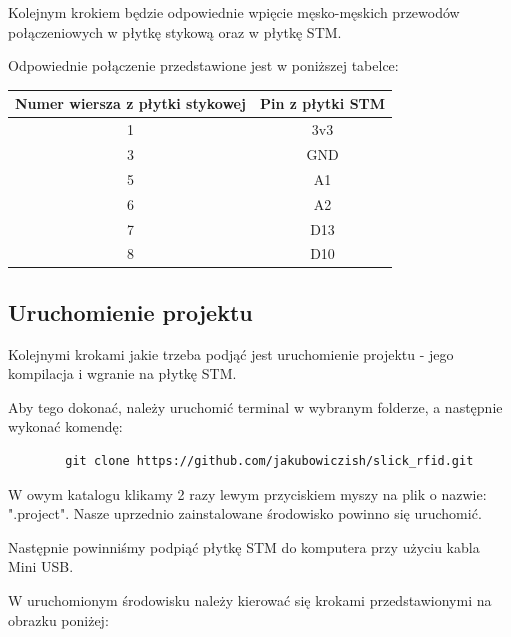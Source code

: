 \documentclass[12pt,hidelinks]{article}
\begin{document}
    \newpage

    Kolejnym krokiem będzie odpowiednie wpięcie męsko-męskich przewodów połączeniowych w płytkę stykową oraz w płytkę STM.

    Odpowiednie połączenie przedstawione jest w poniższej tabelce:

    \begin{center}
        \begin{tabular}{ |c|c| }
            \hline
            Numer wiersza z płytki stykowej & Pin z płytki STM \\
            \hline
            1 & 3v3 \\
            \hline
            3 & GND \\
            \hline
            5 & A1 \\
            \hline
            6 & A2 \\
            \hline
            7 & D13 \\
            \hline
            8 & D10 \\
            \hline
        \end{tabular}
    \end{center}

    \subsection{Uruchomienie projektu}

    Kolejnymi krokami jakie trzeba podjąć jest uruchomienie projektu - jego kompilacja i wgranie na płytkę STM.

    Aby tego dokonać, należy uruchomić terminal w wybranym folderze, a następnie wykonać komendę:

    \begin{verbatim}
        git clone https://github.com/jakubowiczish/slick_rfid.git
    \end{verbatim}

    W owym katalogu klikamy 2 razy lewym przyciskiem myszy na plik o nazwie: ".project". Nasze uprzednio zainstalowane środowisko powinno się uruchomić.

    Następnie powinniśmy podpiąć płytkę STM do komputera przy użyciu kabla Mini USB.

    W uruchomionym środowisku należy kierować się krokami przedstawionymi na obrazku poniżej:
\end{document}
